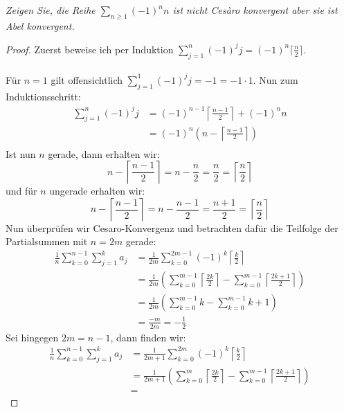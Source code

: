 \documentclass[11pt]{article}
\newenvironment{problem}[2][Beispiel]{
    \begin{trivlist}
        \item[\hskip \labelsep {\bfseries #1}\hskip \labelsep {\bfseries #2.}] \itshape}{
    \end{trivlist}\normalshape
}
\begin{document}
    \begin{problem}{5}
        Zeigen Sie, die Reihe $\sum_{n \geq 1}(-1)^n n$ ist nicht Cesàro konvergent aber sie ist
        Abel konvergent.
    \end{problem}

    \begin{proof}
        Zuerst beweise ich per Induktion $\sum_{j=1}^n (-1)^j j=(-1)^n\lceil\frac{n}{2}\rceil$.\\\\
        Für $n=1$ gilt offensichtlich $\sum_{j=1}^1 (-1)^j j = -1 = -1\cdot 1$. Nun zum Induktionsschritt:
        $$\begin{aligned}
              \sum_{j=1}^n (-1)^j j &= (-1)^{n-1}\left\lceil\frac{n-1}{2}\right\rceil + (-1)^n n\\
              &= (-1)^{n}\left(n-\left\lceil\frac{n-1}{2}\right\rceil\right)\\
        \end{aligned}$$
        Ist nun $n$ gerade, dann erhalten wir:
        $$n-\left\lceil\frac{n-1}{2}\right\rceil = n-\frac{n}{2}=\frac{n}{2}=\left\lceil\frac{n}{2}\right\rceil$$
        und für $n$ ungerade erhalten wir:
        $$n-\left\lceil\frac{n-1}{2}\right\rceil =n-\frac{n-1}{2}=\frac{n+1}{2}=\left\lceil\frac{n}{2}\right\rceil$$
        Nun überprüfen wir Cesaro-Konvergenz und betrachten dafür die Teilfolge der Partialsummen mit
        $n=2m$ gerade:
        $$\begin{aligned}
              \frac{1}{n}\sum_{k=0}^{n-1}\sum_{j=1}^k a_j &=
              \frac{1}{2m}\sum_{k=0}^{2m-1}(-1)^k\left\lceil\frac{k}{2}\right\rceil\\&=
              \frac{1}{2m}\left(\sum_{k=0}^{m-1}\left\lceil\frac{2k}{2}\right\rceil -
              \sum_{k=0}^{m-1}\left\lceil\frac{2k+1}{2}\right\rceil\right)\\&=
              \frac{1}{2m}\left(\sum_{k=0}^{m-1}k -\sum_{k=0}^{m-1}k+1\right)\\&=
              \frac{-m}{2m}=-\frac{1}{2}
        \end{aligned}$$
        Sei hingegen $2m=n-1$, dann finden wir:
        $$\begin{aligned}
              \frac{1}{n}\sum_{k=0}^{n-1}\sum_{j=1}^k a_j &=
              \frac{1}{2m+1}\sum_{k=0}^{2m}(-1)^k\left\lceil\frac{k}{2}\right\rceil\\&=
              \frac{1}{2m+1}\left(\sum_{k=0}^{m}\left\lceil\frac{2k}{2}\right\rceil -
              \sum_{k=0}^{m-1}\left\lceil\frac{2k+1}{2}\right\rceil\right)\\&=

\end{aligned}$$
\end{proof}
\end{document}
